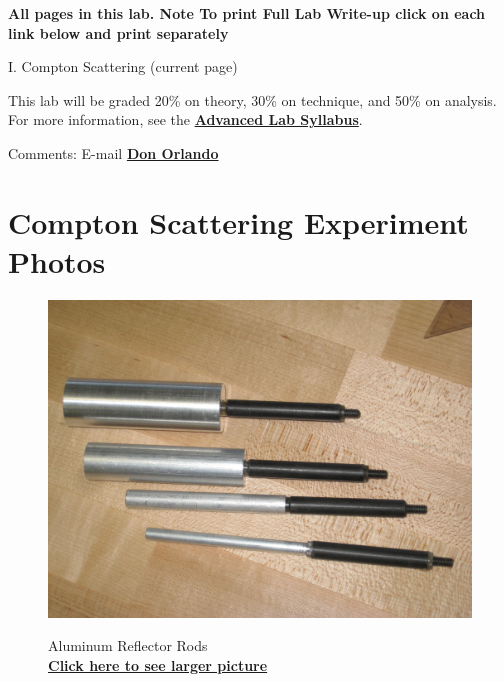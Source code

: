 \documentclass{../lab}
\begin{document}
\textbf{All pages in this lab. Note To print Full Lab Write-up click on each link below and print separately }

I. Compton Scattering (current page)

This lab will be graded 20\% on theory, 30\% on technique, and 50\% on analysis. For more information, see the \href{http://experimentationlab.berkeley.edu/syllabus}{\textbf{Advanced Lab Syllabus}}.

Comments: E-mail \href{\MailDonOrlando}{\textbf{Don Orlando}}

\section{Compton Scattering Experiment Photos}

\begin{figure}[H]
\captionsetup{justification=centering}
\begin{minipage}{.49\linewidth}
    \centering
    \href{http://experimentationlab.berkeley.edu/sites/default/files/images/Rods_3450.JPG}{\includegraphics[width=\linewidth,keepaspectratio]{images/Rods_3450.JPG}} \\
    \caption{Aluminum Reflector Rods \\ \href{http://experimentationlab.berkeley.edu/sites/default/files/images/Rods_3450.JPG}{\textbf{Click here to see larger picture}}}
\end{minipage}\hfill
\begin{minipage}{.49\linewidth}
    \centering

\end{minipage}
\end{figure}
\end{document}
